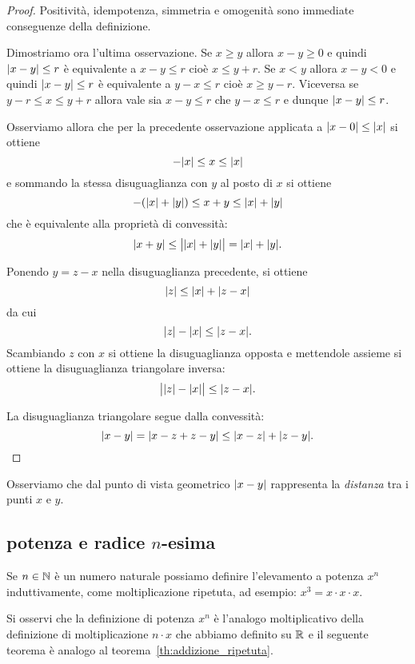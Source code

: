 \begin{proof}
\mymark{*}
Positività, idempotenza, simmetria e omogenità sono immediate conseguenze della definizione.

Dimostriamo ora l'ultima osservazione.
Se $x\ge y$ allora $x-y\ge 0$ e quindi ${\left|x-y\right|} \le r$ è
equivalente a $x-y\le r$ cioè $x\le y+r$.
Se $x<y$ allora $x-y<0$ e quindi ${\left|x-y\right|} \le r$ è
equivalente a $y-x \le r$ cioè $x\ge y-r$.
Viceversa se $y-r \le x \le y+r$ allora vale sia $x-y \le r$ che $y-x \le r$ e 
dunque ${\left|x-y\right|}\le r$.

Osserviamo allora che per la precedente osservazione applicata
a ${\left|x-0\right|} \le {\left|x\right|}$ si ottiene
\[
  -{\left|x\right|} \le x \le {\left|x\right|}
\]
e sommando la stessa disuguaglianza con $y$ al posto di $x$ si
ottiene
\[
  -({\left|x\right|} + {\left|y\right|}) \le x + y \le {\left|x\right|} + {\left|y\right|}
\]
che è equivalente alla proprietà di convessità:
\[
  {\left|x+y\right|} \le \big\lvert{\left|x\right|} + {\left|y\right|}\big\rvert = {\left|x\right|} + {\left|y\right|}.
\]

Ponendo $y=z-x$ nella disuguaglianza precedente, si ottiene
\[
  {\left|z\right|} \le {\left|x\right|} + {\left|z-x\right|}
\]
da cui
\[
  {\left|z\right|} - {\left|x\right|} \le {\left|z-x\right|}.
\]
Scambiando $z$ con $x$ si ottiene la disuguaglianza opposta
e mettendole assieme si ottiene
la disuguaglianza triangolare inversa:
\[
\big\lvert {\left|z\right|}-{\left|x\right|} \big\rvert  \le {\left|z-x\right|}.
\]

La disuguaglianza triangolare segue dalla convessità:
\[
  {\left|x-y\right|} = {\left|x-z + z-y\right|} \le {\left|x-z\right|} + {\left|z-y\right|}.
\]
\end{proof}

Osserviamo che dal punto di vista geometrico
${\left|x-y\right|}$ rappresenta la \emph{distanza} tra i punti
$x$ e $y$.


\subsection{potenza e radice $n$-esima}
%
%
\label{sec:potenza}%
\label{sec:radice}%

Se $n \in {\mathbb N}$ è un numero naturale possiamo definire 
l'elevamento a potenza $x^n$ induttivamente, come moltiplicazione 
ripetuta, ad esempio: $x^3 = x\cdot x \cdot x$.

Si osservi che la definizione di potenza $x^n$ 
è l'analogo moltiplicativo della definizione 
di moltiplicazione $n\cdot x$ che abbiamo definito su ${\mathbb R}$
e il seguente teorema è analogo al 
teorema~\ref{th:addizione_ripetuta}.

